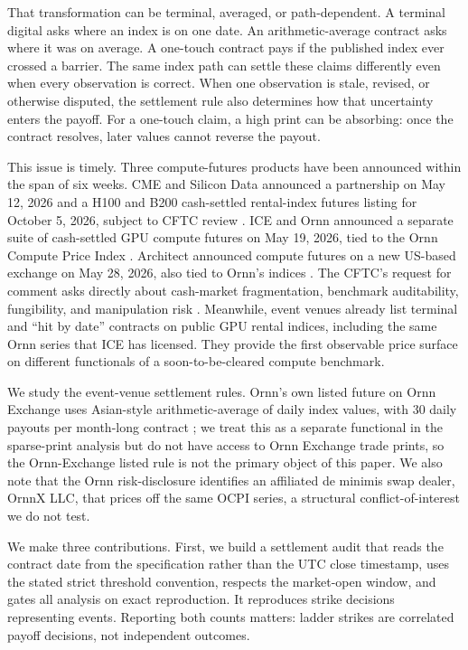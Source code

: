 \documentclass[10pt,twocolumn]{article}
\begin{document}
That transformation can be terminal, averaged, or path-dependent. A terminal
digital asks where an index is on one date. An arithmetic-average contract asks
where it was on average. A one-touch contract pays if the published index ever
crossed a barrier. The same index path can settle these claims differently even
when every observation is correct. When one observation is stale, revised, or
otherwise disputed, the settlement rule also determines how that uncertainty
enters the payoff. For a one-touch claim, a high print can be absorbing: once
the contract resolves, later values cannot reverse the payout.

This issue is timely. Three compute-futures products have been announced within
the span of six weeks. CME and Silicon Data announced a partnership on May 12,
2026 and a H100 and B200 cash-settled rental-index futures listing for October
5, 2026, subject to CFTC review \citep{cme2026}. ICE and Ornn announced a
separate suite of cash-settled GPU compute futures on May 19, 2026, tied to the
Ornn Compute Price Index \citep{ice2026}. Architect announced compute futures
on a new US-based exchange on May 28, 2026, also tied to Ornn's indices
\citep{architect2026}. The CFTC's request for comment asks directly about
cash-market fragmentation, benchmark auditability, fungibility, and
manipulation risk \citep{cftc2026}. Meanwhile, event venues already list
terminal and ``hit by date'' contracts on public GPU rental indices, including
the same Ornn series that ICE has licensed. They provide the first observable
price surface on different functionals of a soon-to-be-cleared compute
benchmark.

We study the event-venue settlement rules. Ornn's own listed future on Ornn
Exchange uses Asian-style arithmetic-average of daily index values, with
30 daily payouts per month-long contract \citep{ornnfutures}; we treat this
as a separate functional in the sparse-print analysis but do not have access
to Ornn Exchange trade prints, so the Ornn-Exchange listed rule is not
the primary object of this paper. We also note that the Ornn risk-disclosure
identifies an affiliated de minimis swap dealer, OrnnX LLC, that prices off
the same OCPI series, a structural conflict-of-interest we do not test.

We make three contributions. First, we build a settlement audit that reads the
contract date from the specification rather than the UTC close timestamp, uses
the stated strict threshold convention, respects the market-open window, and
gates all analysis on exact reproduction. It reproduces \NContracts{} strike
decisions representing \NEvents{} events. Reporting both counts matters: ladder
strikes are correlated payoff decisions, not independent outcomes.
\end{document}
